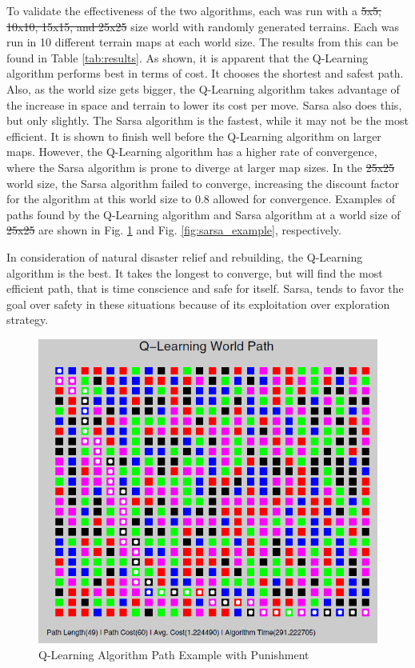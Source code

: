 \documentclass[12pt,american]{report}
\providecommand{\DIFaddtex}[1]{{\protect\color{blue}\uwave{#1}}} %
\providecommand{\DIFdeltex}[1]{{\protect\color{red}\sout{#1}}}                      %
\providecommand{\DIFaddbegin}{} %
\providecommand{\DIFaddend}{} %
\providecommand{\DIFdelbegin}{} %
\providecommand{\DIFdelend}{} %
\providecommand{\DIFaddFL}[1]{\DIFadd{#1}} %
\providecommand{\DIFaddbeginFL}{} %
\providecommand{\DIFaddendFL}{} %
\providecommand{\DIFadd}[1]{\texorpdfstring{\DIFaddtex{#1}}{#1}} %
\providecommand{\DIFdel}[1]{\texorpdfstring{\DIFdeltex{#1}}{}} %
\newcommand{\DIFscaledelfig}{0.5}
\newlength{\DIFdelgraphicswidth} %
\newlength{\DIFdelgraphicsheight} %
\newcommand{\DIFaddincludegraphics}[2][]{{\color{blue}\fbox{\DIFOincludegraphics[#1]{#2}}}} %
\newcommand{\DIFdelincludegraphics}[2][]{%
\sbox{\DIFdelgraphicsbox}{\DIFOincludegraphics[#1]{#2}}%
\settoboxwidth{\DIFdelgraphicswidth}{\DIFdelgraphicsbox} %
\settoboxtotalheight{\DIFdelgraphicsheight}{\DIFdelgraphicsbox} %
\scalebox{\DIFscaledelfig}{%
\parbox[b]{\DIFdelgraphicswidth}{\usebox{\DIFdelgraphicsbox}\\[-\baselineskip] \rule{\DIFdelgraphicswidth}{0em}}\llap{\resizebox{\DIFdelgraphicswidth}{\DIFdelgraphicsheight}{%
\setlength{\unitlength}{\DIFdelgraphicswidth}%
\begin{picture}(1,1)%
\thicklines\linethickness{2pt} %
{\color[rgb]{1,0,0}\put(0,0){\framebox(1,1){}}}%
{\color[rgb]{1,0,0}\put(0,0){\line( 1,1){1}}}%
{\color[rgb]{1,0,0}\put(0,1){\line(1,-1){1}}}%
\end{picture}%
}\hspace*{3pt}}} %
} %
\DeclareRobustCommand{\DIFaddbegin}{\DIFOaddbegin \let\includegraphics\DIFaddincludegraphics} %
\DeclareRobustCommand{\DIFaddend}{\DIFOaddend \let\includegraphics\DIFOincludegraphics} %
\DeclareRobustCommand{\DIFdelbegin}{\DIFOdelbegin \let\includegraphics\DIFdelincludegraphics} %
\DeclareRobustCommand{\DIFdelend}{\DIFOaddend \let\includegraphics\DIFOincludegraphics} %
\DeclareRobustCommand{\DIFaddbeginFL}{\DIFOaddbeginFL \let\includegraphics\DIFaddincludegraphics} %
\DeclareRobustCommand{\DIFaddendFL}{\DIFOaddendFL \let\includegraphics\DIFOincludegraphics} %
\begin{document}
To validate the effectiveness of the two algorithms, each was run with a \DIFdelbegin \DIFdel{5x5, 10x10, 15x15, and 25x25 }\DIFdelend \DIFaddbegin \DIFadd{$5\times  5$, $10\times  10$, $15\times  15$, and $25\times  25$ }\DIFaddend size world with randomly generated terrains.  Each was run in 10 different terrain maps at each world size.  The results from this can be found in Table \ref{tab:results}.  As shown, it is apparent that the Q-Learning algorithm performs best in terms of cost.  It chooses the shortest and safest path. Also, as the world size gets bigger, the Q-Learning algorithm takes advantage of the increase in space and terrain to lower its cost per move. Sarsa also does this, but only slightly.  The Sarsa algorithm is the fastest, while it may not be the most efficient.  It is shown to finish well before the Q-Learning algorithm on larger maps.  However, the Q-Learning algorithm has a higher rate of convergence, where the Sarsa algorithm is prone to diverge at larger map sizes.  In the \DIFdelbegin \DIFdel{25x25 }\DIFdelend \DIFaddbegin \DIFadd{$25\times  25$ }\DIFaddend world size, the Sarsa algorithm failed to converge, increasing the discount factor for the algorithm at this world size to 0.8 allowed for convergence. Examples of paths found by the Q-Learning algorithm and Sarsa algorithm at a world size of \DIFdelbegin \DIFdel{25x25 }\DIFdelend \DIFaddbegin \DIFadd{$25\times  25$ }\DIFaddend are shown in Fig. \ref{fig:q-learning example} and Fig. \ref{fig:sarsa_example}, respectively.

In consideration of natural disaster relief and rebuilding, the Q-Learning algorithm is the best.  It takes the longest to converge, but will find the most efficient path, that is time conscience and safe for itself.  Sarsa, tends to favor the goal over safety in these situations because of its exploitation over exploration strategy. 


\begin{figure}
\centering
\includegraphics[scale=.75]{images/q-learning-example.PNG}
\caption{Q-Learning Algorithm Path Example with Punishment\DIFaddbeginFL \DIFaddFL{.}\DIFaddendFL }
\label{fig:q-learning example}
\end{figure}
\end{document}
